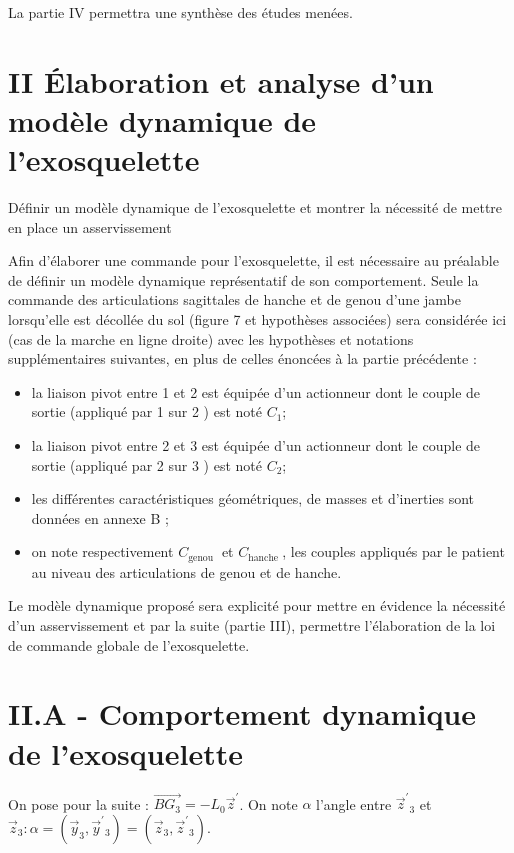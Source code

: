 \documentclass[10pt]{article}
\begin{document}
La partie IV permettra une synthèse des études menées.

\section{II Élaboration et analyse d'un modèle dynamique de l'exosquelette}
Définir un modèle dynamique de l’exosquelette et montrer la nécessité de mettre en place un asservissement

Afin d'élaborer une commande pour l'exosquelette, il est nécessaire au préalable de définir un modèle dynamique représentatif de son comportement. Seule la commande des articulations sagittales de hanche et de genou d'une jambe lorsqu'elle est décollée du sol (figure 7 et hypothèses associées) sera considérée ici (cas de la marche en ligne droite) avec les hypothèses et notations supplémentaires suivantes, en plus de celles énoncées à la partie précédente :

\begin{itemize}
  \item la liaison pivot entre 1 et 2 est équipée d'un actionneur dont le couple de sortie (appliqué par 1 sur 2 ) est noté $C_{1}$;

  \item la liaison pivot entre 2 et 3 est équipée d'un actionneur dont le couple de sortie (appliqué par 2 sur 3 ) est noté $C_{2}$;

  \item les différentes caractéristiques géométriques, de masses et d'inerties sont données en annexe B ;

  \item on note respectivement $C_{\text {genou }}$ et $C_{\text {hanche }}$, les couples appliqués par le patient au niveau des articulations de genou et de hanche.

\end{itemize}

Le modèle dynamique proposé sera explicité pour mettre en évidence la nécessité d'un asservissement et par la suite (partie III), permettre l'élaboration de la loi de commande globale de l'exosquelette.

\section{II.A - Comportement dynamique de l'exosquelette}
On pose pour la suite : $\overrightarrow{B G_{3}}=-L_{0} \vec{z}^{\prime}$. On note $\alpha$ l'angle entre $\vec{z}^{\prime}{ }_{3}$ et $\vec{z}_{3}: \alpha=\left(\vec{y}_{3}, \vec{y}^{\prime}{ }_{3}\right)=\left(\vec{z}_{3}, \vec{z}^{\prime}{ }_{3}\right)$.
\end{document}
